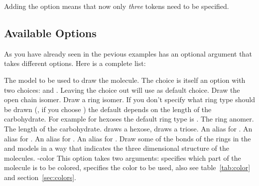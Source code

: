 \documentclass[load-preamble+]{cnltx-doc}
\begin{document}
\begin{example}
  \setatomsep{2.5em}\chemnameinit{}
\end{example}

Adding the option  means that now only \emph{three} tokens
need to be specified.

\begin{example}
  \setatomsep{2.5em}\chemnameinit{}
\end{example}

\subsection{Available Options}
As you have already seen in the pevious examples  has an
optional argument that takes different options.  Here is a complete list:
\begin{options}
    The model to be used to draw the molecule.  The choice 
    is itself an option with two choices:  and
    .  Leaving the choice out will use  as
    default choice.
    Draw the open chain isomer.
    Draw a ring isomer.  If you don't specify what ring type should be drawn
    (\ie, if you choose ) the default depends on the length of the
    carbohydrate.  For example for hexoses the default ring type is
    .
    The ring anomer.
    The length of the carbohydrate.   draws a hexose,
     draws a triose.
    An alias for .
    An alias for .
   An alias for .
    An alias for .
    Draw some of the bonds of the rings in the  and 
    models in a way that indicates the three dimensional structure of the
    molecules.
  \keylit-{color}{}
    This option takes two arguments:  specifies which part of the
    molecule is to be colored,  specifies the color to be used,
    also see table~\vref{tab:color} and section~\ref{sec:colors}.
\end{options}
\end{document}
